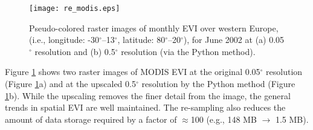 \begin{figure}[b!]
    \texttt{[image: re\_modis.eps]}
    \caption{Pseudo-colored raster images of monthly EVI over western Europe, 
    (i.e., longitude: -30$^{\circ}$--13$^{\circ}$, latitude: 
    80$^{\circ}$--20$^{\circ}$), for June 2002 at (a) 0.05$^{\circ}$ resolution 
    and (b) 0.5$^{\circ}$ resolution (via the Python method).}
    \label{fig:remodis}
\end{figure}

Figure \ref{fig:remodis} shows two raster images of MODIS EVI at the original 0.05$^{\circ}$ resolution (Figure \ref{fig:remodis}a) and at the upscaled 0.5$^{\circ}$ resolution by the Python method (Figure \ref{fig:remodis}b).  
While the upscaling removes the finer detail from the image, the general trends in spatial EVI are well maintained. 
The re-sampling also reduces the amount of data storage required by a factor of $\approx$100 (e.g., 148 MB $\rightarrow$ 1.5 MB).  
